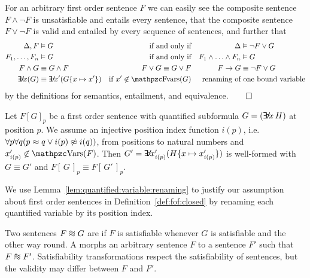 \begin{example}
	For an arbitrary first order sentence \( F \)
	we can easily see the composite sentence \( F\land\lnot F \)
	is unsatisfiable and entails every sentence,
	that the composite sentence \( F\lor\lnot F \) is valid and entailed by every sequence of sentences, and further that
	\begin{align*}
	\Delta, F&\entails G  &\text{if and only if} && \Delta &\entails \lnot F\lor G
	\\
	F_1,\ldots,F_n&\entails G  &\text{if and only if} && F_1\land\ldots\land F_n&\entails G
	\\
	F\land G&\equival G\land F &F\lor G\equival G\lor F && F\limp G &\equival \lnot F\lor G
	\\
	\quantify x (G) &\equiv \quantify x' (G \{x\mapsto x'\} )
	&\text{if } x' \not\in\fvar(G)
	&&\text{renaming of} &\text{ one bound variable}
	\end{align*}
	by the definitions for semantics, entailment, and equivalence.\hfill \( \qed \)
\end{example}

\begin{lemma}\label{lem:quantified:variable:renaming}
	Let \( {F[G]}_p \)
	be a first order sentence with quantified subformula
	\( G = (\quantify x\,H) \) at position \( p \).
	We assume an injective position index function \( i(p) \),
	i.e.~\( \forall p \forall q (p \approx q \lor i(p) \not\approx i(q)  ) \),
	from positions to natural numbers
	and \( x'_{i(p)} \not\in\var(F) \).
	Then \( G' = \quantify x'_{i(p)} (H\{x\mapsto x'_{i(p)}\}) \)
	is well-formed with
	\( G \equiv G' \) and
	\(
		{F[\,G\,]}_p
		\equiv
		{F[\,G'\,]}_p
	\).
\end{lemma}

\noindent We use Lemma~\ref{lem:quantified:variable:renaming}
to justify our assumption about first order sentences
in Definition~\ref{def:fof:closed} by renaming each
quantified variable by its position index.

\begin{definition}\label{def:equisatisfiable}
	Two sentences \( F \equisat G \) are 
	if \( F \) is satisfiable whenever \( G \) is satisfiable
	and the other way round.
	A  morphs an arbitrary sentence
	\( F \) to a sentence \( F' \) such that \( F \equisat F' \).
	Satisfiability transformations respect the satisfiability of sentences,
	but the validity may differ between \( F \) and \( F' \).
\end{definition}

